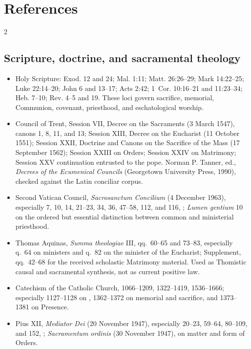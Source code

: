 \section{References}

\begingroup
\footnotesize
\setlength{\columnsep}{1.2em}
\begin{multicols}{2}

\subsection*{Scripture, doctrine, and sacramental theology}

\begin{itemize}[itemsep=0.12em,topsep=0.15em]
\item Holy Scripture: Exod. 12 and 24; Mal. 1:11; Matt. 26:26--29; Mark 14:22--25; Luke 22:14--20; John 6 and 13--17; Acts 2:42; 1~Cor. 10:16--21 and 11:23--34; Heb. 7--10; Rev. 4--5 and 19. These loci govern sacrifice, memorial, Communion, covenant, priesthood, and eschatological worship.
\item Council of Trent, Session VII, Decree on the Sacraments (3 March 1547), canons 1, 8, 11, and 13; Session XIII, Decree on the Eucharist (11 October 1551); Session XXII, Doctrine and Canons on the Sacrifice of the Mass (17 September 1562); Session XXIII on Orders; Session XXIV on Matrimony; Session XXV continuation entrusted to the pope. Norman P. Tanner, ed., \emph{Decrees of the Ecumenical Councils} (Georgetown University Press, 1990), checked against the Latin conciliar corpus.
\item Second Vatican Council, \emph{Sacrosanctum Concilium} (4 December 1963), especially 7, 10, 14, 21--23, 34, 36, 47--58, 112, and 116, ; \emph{Lumen gentium} 10 on the ordered but essential distinction between common and ministerial priesthood.
\item Thomas Aquinas, \emph{Summa theologiae} III, qq.~60--65 and 73--83, especially q.~64 on ministers and q.~82 on the minister of the Eucharist; Supplement, qq.~42--68 for the received scholastic Matrimony material. Used as Thomistic causal and sacramental synthesis, not as current positive law.
\item Catechism of the Catholic Church, 1066--1209, 1322--1419, 1536--1666; especially 1127--1128 on , 1362--1372 on memorial and sacrifice, and 1373--1381 on Presence.
\item Pius XII, \emph{Mediator Dei} (20 November 1947), especially 20--23, 59--64, 80--109, and 152, ; \emph{Sacramentum ordinis} (30 November 1947), on matter and form of Orders.
\end{itemize}


\end{multicols}

